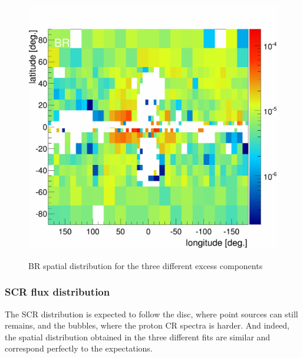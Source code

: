 \begin{figure}[h]
\begin{minipage}[h]{0.3\textwidth}
	  \label{}
  \end{minipage}
  \hfill
  \begin{minipage}[h]{0.3\textwidth}
	  \centering
	  \includegraphics[width=1.\linewidth]{pic/discussion/MSPonly_BR_integral_flux.png}
	  \label{}
  \end{minipage}
  \caption{BR spatial distribution for the three different excess components}
  \label{fig:BR_flux_distrib_excess_comp}	 
\end{figure}

\subsubsection{SCR flux distribution}
The SCR distribution is expected to follow the disc, where point sources can still remains, and the bubbles, where the proton CR spectra is harder. And indeed, the spatial distribution obtained in the three  different fits are similar and correspond perfectly to the expectations.


